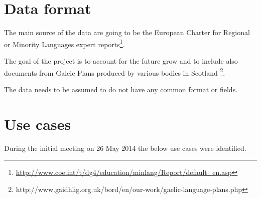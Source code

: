 \documentclass[a4paper]{tufte-book}
\begin{document}
\section{Data format}
The main source of the data are going to be the European Charter for Regional or Minority Languages expert reports\footnote{\url{http://www.coe.int/t/dg4/education/minlang/Report/default_en.asp}}.

The goal of the project is to account for the future grow and to include also documents from Galeic Plans produced by various bodies in Scotland \footnote{http://www.gaidhlig.org.uk/bord/en/our-work/gaelic-language-plans.php}.

The data needs to be assumed to do not have any common format or fields.

\section{Use cases}
During the initial meeting on 26 May 2014 the below use cases were identified.
\end{document}
